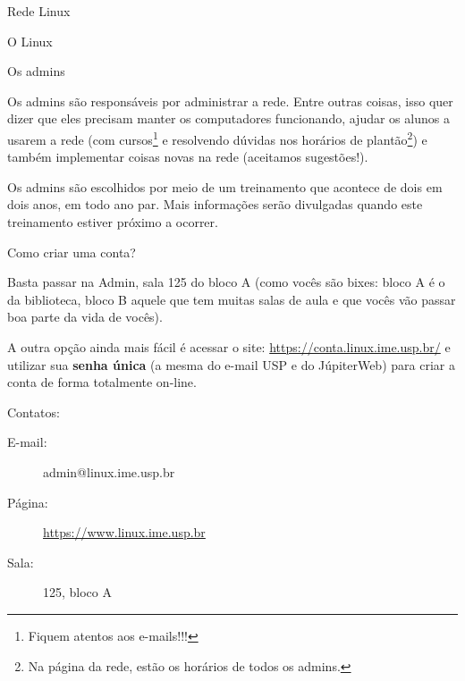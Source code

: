 \begin{subsecao}{Rede Linux}
\begin{subsubsecao}{O Linux}
\end{subsubsecao}

\begin{subsubsecao}{Os admins}

Os admins são responsáveis por administrar a rede. Entre outras coisas,
isso quer dizer que eles precisam manter os computadores funcionando, ajudar os alunos a
usarem a rede (com cursos\footnote{ Fiquem atentos aos e-mails!!!} e resolvendo
dúvidas nos horários de plantão\footnote{ Na página da rede, estão os horários
de todos os admins.}) e também implementar coisas novas na rede (aceitamos
sugestões!).

Os admins são escolhidos por meio de um treinamento que acontece de dois em dois anos,
em todo ano par. Mais informações serão divulgadas quando este treinamento estiver 
próximo a ocorrer.

\end{subsubsecao}
\begin{subsubsecao}{Como criar uma conta?}

Basta passar na Admin, sala 125 do bloco A (como vocês são bixes: bloco A é o da
biblioteca, bloco B aquele que tem muitas salas de aula e que vocês vão passar boa
parte da vida de vocês).

A outra opção ainda mais fácil é acessar o site: \url{https://conta.linux.ime.usp.br/}
e utilizar sua \textbf{senha única} (a mesma do e-mail USP e do JúpiterWeb) para criar
a conta de forma totalmente on-line.

Contatos:

\vspace{-1em}

\begin{description}
\item [E-mail:] admin@linux.ime.usp.br
\item [Página:] \url{https://www.linux.ime.usp.br}
\item [Sala:] 125, bloco A
\end{description}

\vspace{-.5em}

\end{subsubsecao}

\end{subsecao}
